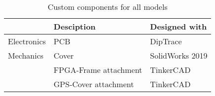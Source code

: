 \begin{table}[H]

\centering
    \caption{Custom components for all models}
    \label{tab:comp_custom}
    
\begin{tabular}{lll}
\hline
\rowcolor[HTML]{FFFFFF} 
\multicolumn{1}{|l|}{\cellcolor[HTML]{FFFFFF}Category} & \multicolumn{1}{l|}{\cellcolor[HTML]{FFFFFF}Desciption} & \multicolumn{1}{l|}{\cellcolor[HTML]{FFFFFF}Designed with} \\ \hline
\rowcolor[HTML]{9AFF99} 
Electronics                                            & PCB                                                     & DipTrace                                                   \\
\rowcolor[HTML]{FFFC9E} 
Mechanics                                                   & Cover                                                   & SolidWorks 2019                                            \\
\rowcolor[HTML]{FFFC9E} 
                                                       & FPGA-Frame attachment                                   & TinkerCAD                                                 \\
\rowcolor[HTML]{FFFC9E} 
                                                       & GPS-Cover attachment                                   & TinkerCAD                                                                                           
\end{tabular}
\end{table}